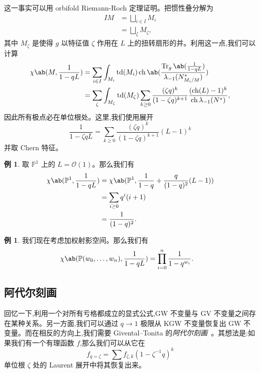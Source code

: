 \documentclass{amsart}
\theoremstyle{definition}
\newtheorem{exm}[thm]{例}
\theoremstyle{remark}
\theoremstyle{plain}
\theoremstyle{definition}
\theoremstyle{remark}
\renewcommand{\P}{\mathbb{P}}
\newcommand{\mc}[1]{\mathcal{#1}}
\newcommand{\on}[1]{\operatorname{#1}}
\newcommand{\1}{\mathbf{1}}
\newcommand{\2}{\mathbf{2}}
\newcommand{\3}{\mathbf{3}}
\DeclareMathOperator{\ch}{ch}
\begin{document}
这一事实可以用 orbifold Riemann-Roch 定理证明。把惯性叠分解为
\begin{align*}
    IM &= \bigsqcup_{i \in I} M_i \\
    &= \bigsqcup_{\zeta} M_{\zeta},
\end{align*}
其中 \(M_{\zeta}\) 是使得 \(g\) 以特征值 \(\zeta\) 作用在 \(L\) 上的扭转扇形的并。利用这一点,我们可以计算
\begin{align*}
    \chi\ab(M, \frac{1}{1-qL}) &= \sum_{i \in I} \int_{M_i} \on{td}(M_i) \on{ch} \ab(\frac{ \on{Tr}_g \ab(\frac{1}{1-qL}) }{\lambda_{-1}(N_{M_i/M}^*)}) \\
    &= \sum_{\zeta} \int_{M_{\zeta}} \on{td}(M_{\zeta}) \sum_{k \geq 0} \frac{(\zeta q)^k}{(1-\zeta q)^{k+1}} \frac{( \on{ch}(L)-1 )^k}{\ch \lambda_{-1}(N^*)},
\end{align*}
因此所有极点必在单位根处。这里,我们使用展开
\[ \frac{1}{1-\zeta q L} = \sum_{k \geq 0} \frac{(\zeta q)^k}{(1-\zeta q)^{k+1}} (L-1)^k \]
并取 Chern 特征。

\begin{exm}
    取 \(\P^1\) 上的 \(L = \mc{O}(1)\)。那么我们有
    \begin{align*}
        \chi\ab(\P^1, \frac{1}{1-qL}) &= \chi\ab(\P^1, \frac{1}{1-q} + \frac{q}{(1-q)^2}(L-1)) \\
        &= \sum_{i \geq 0} q^i (i+1) \\
        &= \frac{1}{(1-q)^2}.
    \end{align*}
\end{exm}

\begin{exm}
    我们现在考虑加权射影空间。那么我们有
    \begin{align*}
        \chi\ab(\P(w_0, \ldots, w_n), \frac{1}{1-qL}) &= \prod_{i=0}^n \frac{1}{1-q^{w_i}}.
    \end{align*}
\end{exm}
\subsection{阿代尔刻画}%
\label{sub:Adelic characterization}

回忆一下,利用一个对所有亏格都成立的显式公式,GW 不变量与 GV 不变量之间存在某种关系。另一方面,我们可以通过 \(q \to 1\) 极限从 KGW 不变量恢复出 GW 不变量。而在相反的方向上,我们需要 Givental--Tonita 的\textit{阿代尔刻画}~\cite{GiventalTonita2014}。其想法是:如果我们有一个有理函数 \(f\),那么我们可以从它在
\[ f_{q=\zeta} = \sum f_{\zeta, k} (1-\zeta^{-1} q)^k \]
单位根 \(\zeta\) 处的 Laurent 展开中将其恢复出来。
\end{document}
